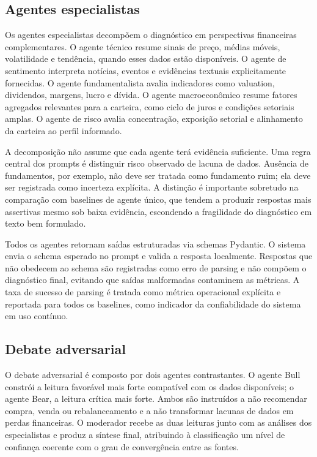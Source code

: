 \subsection{Agentes especialistas}

Os agentes especialistas decompõem o diagnóstico em perspectivas
financeiras complementares. O agente técnico resume sinais de preço,
médias móveis, volatilidade e tendência, quando esses dados estão
disponíveis. O agente de sentimento interpreta notícias, eventos e
evidências textuais explicitamente fornecidas. O agente fundamentalista
avalia indicadores como valuation, dividendos, margens, lucro e dívida.
O agente macroeconômico resume fatores agregados relevantes para a
carteira, como ciclo de juros e condições setoriais amplas. O agente de
risco avalia concentração, exposição setorial e alinhamento da carteira
ao perfil informado.

A decomposição não assume que cada agente terá evidência suficiente. Uma
regra central dos prompts é distinguir risco observado de lacuna de
dados. Ausência de fundamentos, por exemplo, não deve ser tratada como
fundamento ruim; ela deve ser registrada como incerteza explícita. A
distinção é importante sobretudo na comparação com baselines de agente
único, que tendem a produzir respostas mais assertivas mesmo sob baixa
evidência, escondendo a fragilidade do diagnóstico em texto bem
formulado.

Todos os agentes retornam saídas estruturadas via schemas Pydantic. O
sistema envia o schema esperado no prompt e valida a resposta localmente.
Respostas que não obedecem ao schema são registradas como erro de parsing
e não compõem o diagnóstico final, evitando que saídas malformadas
contaminem as métricas. A taxa de sucesso de parsing é tratada como
métrica operacional explícita e reportada para todos os baselines, como
indicador da confiabilidade do sistema em uso contínuo.

\subsection{Debate adversarial}

O debate adversarial é composto por dois agentes contrastantes. O agente
Bull constrói a leitura favorável mais forte compatível com os dados
disponíveis; o agente Bear, a leitura crítica mais forte. Ambos são
instruídos a não recomendar compra, venda ou rebalanceamento e a não
transformar lacunas de dados em perdas financeiras. O moderador recebe as
duas leituras junto com as análises dos especialistas e produz a síntese
final, atribuindo à classificação um nível de confiança coerente com o
grau de convergência entre as fontes.

